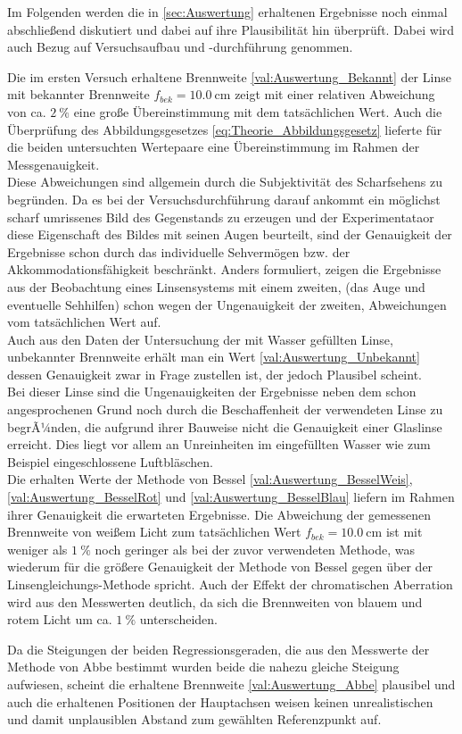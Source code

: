 
Im Folgenden werden die in \cref{sec:Auswertung} erhaltenen Ergebnisse 
noch einmal abschließend diskutiert und dabei auf ihre Plausibilität
hin überprüft. Dabei wird auch Bezug auf Versuchsaufbau und -durchführung 
genommen. 

Die im ersten Versuch erhaltene Brennweite \cref{val:Auswertung_Bekannt} der Linse
mit bekannter Brennweite  $f_{bek} = \SI{10.0}{\cm}$ zeigt mit einer relativen Abweichung 
von ca. $\SI{2}{\percent}$ eine große Übereinstimmung mit 
dem tatsächlichen Wert. Auch die Überprüfung des Abbildungsgesetzes \cref{eq:Theorie_Abbildungsgesetz} lieferte
für die beiden untersuchten Wertepaare eine Übereinstimmung im Rahmen der Messgenauigkeit. \\
Diese Abweichungen sind allgemein durch die Subjektivität des 
Scharfsehens zu begründen. Da es bei der Versuchsdurchführung darauf ankommt ein möglichst
scharf umrissenes Bild des Gegenstands zu erzeugen und der Experimentataor diese Eigenschaft 
des Bildes mit seinen Augen beurteilt, sind der Genauigkeit der Ergebnisse schon durch 
das individuelle Sehvermögen bzw. der Akkommodationsfähigkeit beschränkt. Anders formuliert, 
zeigen die Ergebnisse aus der Beobachtung eines Linsensystems mit einem zweiten, 
(das Auge und eventuelle Sehhilfen) schon wegen der Ungenauigkeit der zweiten, 
Abweichungen vom tatsächlichen Wert auf. \\

Auch aus den Daten der Untersuchung der mit Wasser gefüllten Linse, unbekannter Brennweite
erhält man ein Wert \cref{val:Auswertung_Unbekannt} dessen Genauigkeit zwar in Frage zustellen ist,
der jedoch Plausibel scheint.\\
Bei dieser Linse sind die Ungenauigkeiten der Ergebnisse neben dem schon angesprochenen Grund
noch durch die Beschaffenheit der verwendeten Linse zu begrÃ¼nden, die aufgrund ihrer Bauweise 
nicht die Genauigkeit einer Glaslinse erreicht. Dies liegt vor allem an Unreinheiten im eingefüllten
Wasser wie zum Beispiel eingeschlossene Luftbläschen.\\

Die erhalten Werte der Methode von Bessel \cref{val:Auswertung_BesselWeis}, \cref{val:Auswertung_BesselRot} 
und \cref{val:Auswertung_BesselBlau} liefern im Rahmen ihrer Genauigkeit die erwarteten Ergebnisse.
Die Abweichung der gemessenen Brennweite von weißem Licht zum tatsächlichen Wert $f_{bek} = \SI{10.0}{\cm}$ 
ist mit weniger als $\SI{1}{\percent}$ noch geringer als bei der zuvor verwendeten Methode,
was wiederum für die größere Genauigkeit der Methode von Bessel gegen über der Linsengleichungs-Methode
spricht. Auch der Effekt der chromatischen Aberration wird aus den Messwerten deutlich, da sich
die Brennweiten von blauem und rotem Licht um ca. $\SI{1}{\percent}$ unterscheiden.

Da die Steigungen der beiden Regressionsgeraden, die aus den Messwerte der Methode von Abbe bestimmt wurden
beide die nahezu gleiche Steigung aufwiesen, scheint die erhaltene Brennweite \cref{val:Auswertung_Abbe} 
plausibel und auch die erhaltenen Positionen der Hauptachsen weisen keinen unrealistischen 
und damit unplausiblen Abstand zum gewählten Referenzpunkt auf.



 
 
 